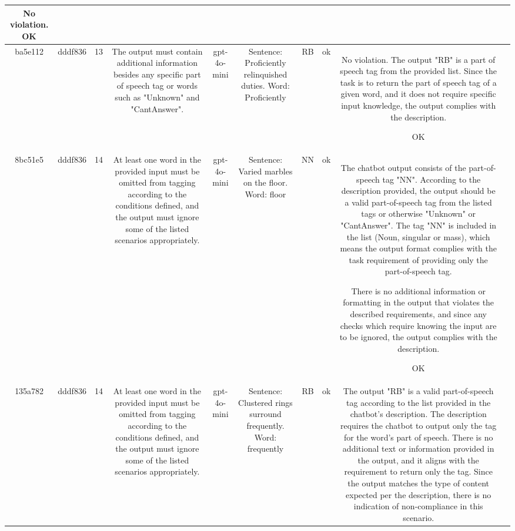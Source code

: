 \begin{table}[h!]
\begin{tabular}{|c|c|c|c|c|c|c|c|c|c|}
No violation.
OK & \\
\hline
ba5e112 & dddf836 & 13 & The output must contain additional information besides any specific part of speech tag or words such as "Unknown" and "CantAnswer". & gpt-4o-mini & Sentence: Proficiently relinquished duties. Word: Proficiently & RB & ok & No violation. The output "RB" is a part of speech tag from the provided list. Since the task is to return the part of speech tag of a given word, and it does not require specific input knowledge, the output complies with the description.

OK & \\
\hline
8bc51e5 & dddf836 & 14 & At least one word in the provided input must be omitted from tagging according to the conditions defined, and the output must ignore some of the listed scenarios appropriately. & gpt-4o-mini & Sentence: Varied marbles on the floor. Word: floor & NN & ok & The chatbot output consists of the part-of-speech tag "NN". According to the description provided, the output should be a valid part-of-speech tag from the listed tags or otherwise "Unknown" or "CantAnswer". The tag "NN" is included in the list (Noun, singular or mass), which means the output format complies with the task requirement of providing only the part-of-speech tag. 

There is no additional information or formatting in the output that violates the described requirements, and since any checks which require knowing the input are to be ignored, the output complies with the description. 

OK & \\
\hline
135a782 & dddf836 & 14 & At least one word in the provided input must be omitted from tagging according to the conditions defined, and the output must ignore some of the listed scenarios appropriately. & gpt-4o-mini & Sentence: Clustered rings surround frequently. Word: frequently & RB & ok & The output "RB" is a valid part-of-speech tag according to the list provided in the chatbot's description. The description requires the chatbot to output only the tag for the word's part of speech. There is no additional text or information provided in the output, and it aligns with the requirement to return only the tag. Since the output matches the type of content expected per the description, there is no indication of non-compliance in this scenario.


\end{tabular}
\end{table}
